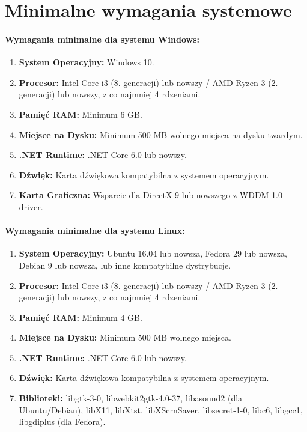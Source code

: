 \newpage

\section{Minimalne wymagania systemowe}

\paragraph{Wymagania minimalne dla systemu Windows:}

\begin{enumerate}
    \item \textbf{ System Operacyjny:} Windows 10.
    \item \textbf{ Procesor:} Intel Core i3 (8. generacji) lub nowszy / AMD Ryzen 3 (2. generacji) lub nowszy, z co najmniej 4 rdzeniami.
    \item \textbf{ Pamięć RAM:} Minimum 6 GB.
    \item \textbf{ Miejsce na Dysku:} Minimum 500 MB wolnego miejsca na dysku twardym.
    \item \textbf{ .NET Runtime:} .NET Core 6.0 lub nowszy.
    \item \textbf{ Dźwięk:} Karta dźwiękowa kompatybilna z systemem operacyjnym.
    \item \textbf{ Karta Graficzna:} Wsparcie dla DirectX 9 lub nowszego z WDDM 1.0 driver.
\end{enumerate}

\paragraph{Wymagania minimalne dla systemu Linux:}

\begin{enumerate}
    \item \textbf{ System Operacyjny:} Ubuntu 16.04 lub nowsza, Fedora 29 lub nowsza, Debian 9 lub nowsza, lub inne kompatybilne dystrybucje.
    \item \textbf{ Procesor:} Intel Core i3 (8. generacji) lub nowszy / AMD Ryzen 3 (2. generacji) lub nowszy, z co najmniej 4 rdzeniami.
    \item \textbf{ Pamięć RAM:}  Minimum 4 GB.
    \item \textbf{ Miejsce na Dysku:} Minimum 500 MB wolnego miejsca.
    \item \textbf{ .NET Runtime:} .NET Core 6.0 lub nowszy.
    \item \textbf{ Dźwięk:} Karta dźwiękowa kompatybilna z systemem operacyjnym.
    \item \textbf{ Biblioteki:} libgtk-3-0, libwebkit2gtk-4.0-37, libasound2 (dla Ubuntu/Debian), libX11, libXtst, libXScrnSaver, libsecret-1-0, libc6, libgcc1, libgdiplus (dla Fedora).
    
\end{enumerate}




